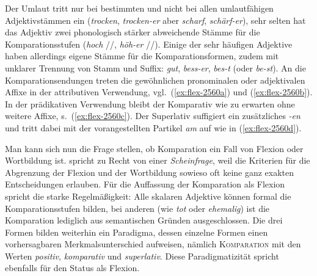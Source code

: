 Der Umlaut tritt nur bei bestimmten und nicht bei allen umlautfähigen Adjektivstämmen ein (\textit{trocken}, \textit{trocken-er} aber \textit{scharf}, \textit{schärf-er}), sehr selten hat das Adjektiv zwei phonologisch stärker abweichende Stämme für die Komparationsstufen (\textit{hoch} //, \textit{höh-er} //).
Einige der sehr häufigen Adjektive haben allerdings eigene Stämme für die Komparationsformen, zudem mit unklarer Trennung von Stamm und Suffix: \textit{gut}, \textit{bess-er}, \textit{bes-t} (oder \textit{be-st}).
An die Komparationsendungen treten die gewöhnlichen pronominalen oder adjektivalen Affixe in der attributiven Verwendung, vgl.\ (\ref{ex:flex-2560a}) und (\ref{ex:flex-2560b}).
In der prädikativen Verwendung bleibt der Komparativ wie zu erwarten ohne weitere Affixe, s.\ (\ref{ex:flex-2560c}).
Der Superlativ suffigiert ein zusätzliches \textit{-en} und tritt dabei mit der vorangestellten Partikel \textit{am} auf wie in (\ref{ex:flex-2560d}).

\begin{exe}
  \ex \label{ex:flex2560}
  \begin{xlist}
  \end{xlist}
\end{exe}


Man kann sich nun die Frage stellen, ob Komparation ein Fall von Flexion oder Wortbildung ist.
\citet[177]{Eisenberg2013a} spricht zu Recht von einer \textit{Scheinfrage}, weil die Kriterien für die Abgrenzung der Flexion und der Wortbildung sowieso oft keine ganz exakten Entscheidungen erlauben.
Für die Auffassung der Komparation als Flexion spricht die starke Regelmäßigkeit:
Alle skalaren Adjektive können formal die Komparationsstufen bilden, bei anderen (wie \textit{tot} oder \textit{ehemalig}) ist die Komparation lediglich aus semantischen Gründen ausgeschlossen.
Die drei Formen bilden weiterhin ein Paradigma, dessen einzelne Formen einen vorhersagbaren Merkmalsunterschied aufweisen, nämlich \textsc{Komparation} mit den Werten \textit{positiv}, \textit{komparativ} und \textit{superlativ}.
Diese Paradigmatizität spricht ebenfalls für den Status als Flexion.


